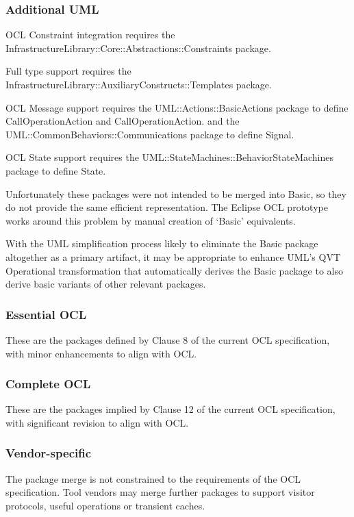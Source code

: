 \documentclass{eceasst}
\begin{document}
\subsubsection{Additional UML}

OCL Constraint integration requires the InfrastructureLibrary::Core::Abstractions::Constraints package.

Full type support requires the InfrastructureLibrary::AuxiliaryConstructs::Templates package.

OCL Message support requires the UML::Actions::BasicActions package to define CallOperationAction and CallOperationAction. and the UML::CommonBehaviors::Communications package to define Signal.

OCL State support requires the UML::StateMachines::BehaviorStateMachines package to define State.

Unfortunately these packages were not intended to be merged into Basic, so they do not provide the same efficient representation. The Eclipse OCL prototype works around this problem by manual creation of `Basic' equivalents.

With the UML simplification process\cite{UML-simple} likely to eliminate the Basic package altogether as a primary artifact, it may be appropriate to enhance UML's QVT Operational transformation that automatically derives the Basic package to also derive basic variants of other relevant packages.

\subsubsection{Essential OCL}

These are the packages defined by Clause 8 of the current OCL specification, with minor enhancements to align with OCL. 

\subsubsection{Complete OCL}

These are the packages implied by Clause 12 of the current OCL specification, with significant revision to align with OCL. 

\subsubsection{Vendor-specific}

The package merge is not constrained to the requirements of the OCL specification. Tool vendors may merge further packages to support visitor protocols, useful operations or transient caches.
\end{document}
